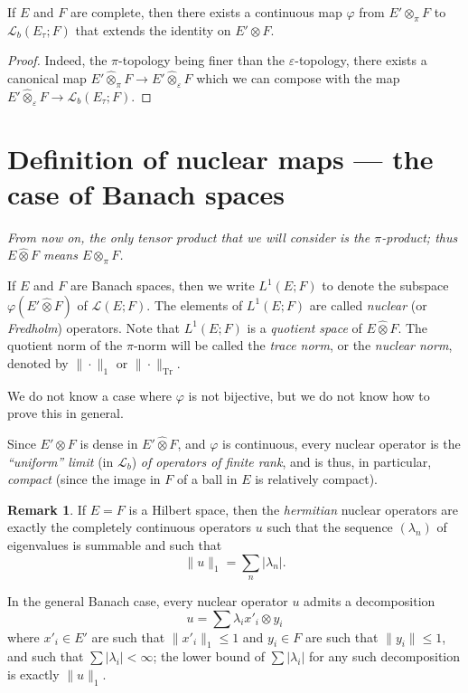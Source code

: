 \documentclass{article}
\theoremstyle{plain}
\newenvironment{corollary}[1]
    {\renewcommand\theinnercustomcorollary{#1}\innercustomcorollary}
    {\endinnercustomcorollary}
\theoremstyle{definition}
\newtheorem*{remark}{Remark}
\newenvironment{definition}[1]
    {\renewcommand\theinnercustomdefinition{#1}\innercustomdefinition}
    {\endinnercustomdefinition}
\newcommand{\LL}{\mathcal{L}}
\newcommand{\projotimes}{{\otimes}_\pi}
\newcommand{\cprojotimes}{\widehat{\otimes}_\pi}
\newcommand{\cinjotimes}{\widehat{\otimes}_\varepsilon}
\newcommand{\cotimes}{\widehat{\otimes}}
\newcommand{\tr}{\operatorname{Tr}}
\renewcommand{\leq}{\leqslant}
\newcommand{\oldpage}[1]{\marginpar{\footnotesize$\Big\vert$ \textit{p.~#1}}}
\begin{document}
\begin{corollary}{1}
\label{corollary-1}
  If $E$ and $F$ are complete, then there exists a continuous map $\varphi$ from $E'\projotimes F$ to $\LL_b(E_\tau;F)$ that extends the identity on $E'\otimes F$.
\end{corollary}

\begin{proof}
  Indeed, the $\pi$-topology being finer than the $\varepsilon$-topology, there exists a canonical map $E'\cprojotimes F\to E'\cinjotimes F$ which we can compose with the map $E'\cinjotimes F\to \LL_b(E_\tau;F)$.
\end{proof}

\section{Definition of nuclear maps — the case of Banach spaces}
\label{section3}

\oldpage{3}
\emph{From now on, the only tensor product that we will consider is the $\pi$-product; thus $E\cotimes F$ means $E\cprojotimes F$.}

\begin{definition}{1}
\label{definition1}
  If $E$ and $F$ are Banach spaces, then we write $L^1(E;F)$ to denote the subspace $\varphi(E'\cotimes F)$ of $\LL(E;F)$.
  The elements of $L^1(E;F)$ are called \emph{nuclear} (or \emph{Fredholm}) operators.
  Note that $L^1(E;F)$ is a \emph{quotient space} of $E\cotimes F$.
  The quotient norm of the $\pi$-norm will be called the \emph{trace norm}, or the \emph{nuclear norm}, denoted by $\|\cdot\|_1$ or $\|\cdot\|_{\tr}$.
\end{definition}

We do not know a case where $\varphi$ is not bijective, but we do not know how to prove this in general.

Since $E'\otimes F$ is dense in $E'\cotimes F$, and $\varphi$ is continuous, every nuclear operator is the \emph{``uniform'' limit} (in $\LL_b$) \emph{of operators of finite rank}, and is thus, in particular, \emph{compact} (since the image in $F$ of a ball in $E$ is relatively compact).

\begin{remark}
  If $E=F$ is a Hilbert space, then the \emph{hermitian} nuclear operators are exactly the completely continuous operators $u$ such that the sequence $(\lambda_n)$ of eigenvalues is summable and such that
  \[
    \|u\|_1 = \sum_n|\lambda_n|.
  \]

  In the general Banach case, every nuclear operator $u$ admits a decomposition
  \[
    u = \sum\lambda_i x'_i\otimes y_i
  \]
  where $x'_i\in E'$ are such that $\|x'_i\|_1\leq1$ and $y_i\in F$ are such that $\|y_i\|\leq1$, and such that $\sum|\lambda_i|<\infty$;
  the lower bound of $\sum|\lambda_i|$ for any such decomposition is exactly $\|u\|_1$.
\end{remark}
\end{document}
